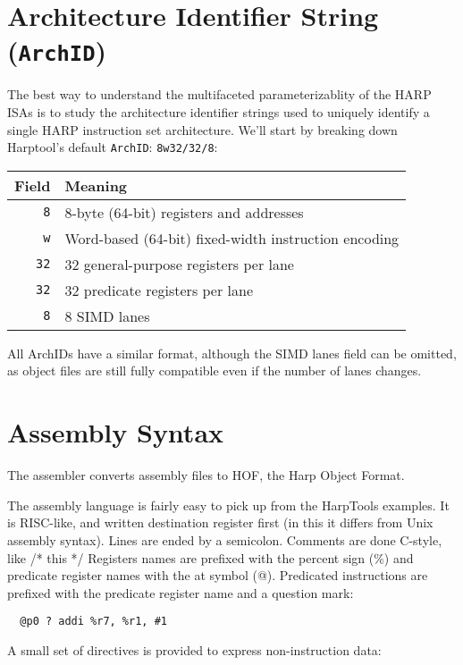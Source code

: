 \documentclass[10pt,letterpaper]{article}
\begin{document}
\section*{Architecture Identifier String (\texttt{ArchID})}
The best way to understand the multifaceted parameterizablity of the HARP ISAs is to study the architecture identifier strings used to uniquely identify a single HARP instruction set architecture.
We'll start by breaking down Harptool's default \texttt{ArchID}: \texttt{8w32/32/8}:

\begin{center}
\begin{tabular}{rl}
\textbf{Field}&\textbf{Meaning}\\
\hline
\texttt{8} &8-byte (64-bit) registers and addresses\\
\texttt{w} &Word-based (64-bit) fixed-width instruction encoding\\
\texttt{32}&32 general-purpose registers per lane\\
\texttt{32}&32 predicate registers per lane\\
\texttt{8} &8 SIMD lanes\\
\end{tabular}
\end{center}

All ArchIDs have a similar format, although the SIMD lanes field can be omitted, as object files are still fully compatible even if the number of lanes changes. 



\section*{Assembly Syntax}
The assembler converts assembly files to HOF, the Harp Object Format.

The assembly language is fairly easy to pick up from the HarpTools examples. It is RISC-like, and written destination register first (in this it differs from Unix assembly syntax).
Lines are ended by a semicolon. Comments are done C-style, like /* this */
Registers names are prefixed with the percent sign (\%) and predicate register names with the at symbol (@).
Predicated instructions are prefixed with the predicate register name and a question mark:
\begin{verbatim}
  @p0 ? addi %r7, %r1, #1
\end{verbatim}
A small set of directives is provided to express non-instruction data:
\end{document}

